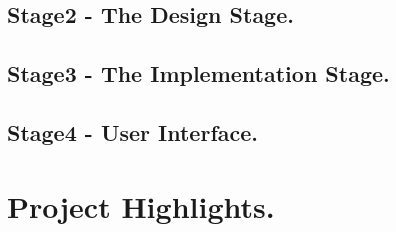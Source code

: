 \documentclass[10pt,conference]{IEEEtran}
\begin{document}
\subsection{Stage2 - The Design Stage. }\label{sec: 2:The Design Stage.}


\subsection{Stage3 - The Implementation Stage. }\label{sec: 3 The Implementation Stage.}


\subsection{Stage4 -	User Interface. }\label{sec: 4. User Interface.}


\section{Project Highlights.}\label{sec:7. Project Highlights.}




%
%
\end{document}
